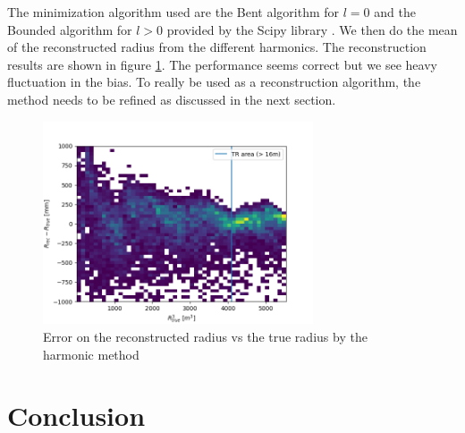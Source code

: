 \documentclass[../main.tex]{subfiles}
\begin{document}
The minimization algorithm used are the Bent algorithm for $l=0$ and the Bounded algorithm for $l > 0$ provided by the Scipy library \cite{virtanen_scipy_2020}. We then do the mean of the reconstructed radius from the different harmonics. The reconstruction results are shown in figure \ref{fig:annex:jgnn:harmonic:reco}. The performance seems correct but we see heavy fluctuation in the bias. To really be used as a reconstruction algorithm, the method needs to be refined as discussed in the next section.

\begin{figure}[ht]
  \centering
  \includegraphics[height=6cm]{images/jgnn/harmonic/Radius_reco.png}
  \caption{Error on the reconstructed radius vs the true radius by the harmonic method}
  \label{fig:annex:jgnn:harmonic:reco}
\end{figure}

\section*{Conclusion}
\end{document}
